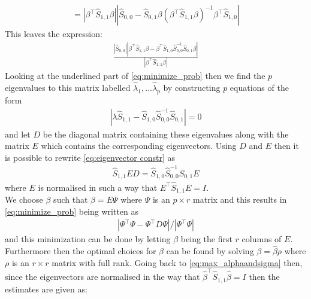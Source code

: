 \begin{bevis}
\begin{align*}
         =|\beta^{\top} \hat{S}_{1,1}\beta||\hat{S}_{0,0}-\hat{S}_{0,1}\beta(\beta^{\top} \hat{S}_{1,1}\beta)^{-1}\beta^{\top}\hat{S}_{1,0}|
 \end{align*}
 This leaves the expression:
 \begin{align}\label{eq:minimize_prob}
     \frac{|\hat{S}_{0,0}||\beta^{\top}\hat{S}_{1,1}\beta-\beta^{\top}\underline{\hat{S}_{1,0}\hat{S}^{-1}_{0,0}\hat{S}_{0,1}}\beta|}
     {|\beta^{\top} \hat{S}_{1,1}\beta|}
 \end{align}
 Looking at the underlined part of \eqref{eq:minimize_prob} then we find the $p$ eigenvalues to this matrix labelled $\hat{\lambda}_1,\ldots\hat{\lambda}_p$ by constructing $p$ equations of the form
 \begin{align}\label{eq:eigenvector constr}
     |\lambda \hat{S}_{1,1}-\hat{S}_{1,0}\hat{S}^{-1}_{0,0}\hat{S}_{0,1}|=0
 \end{align}
and let $D$ be the diagonal matrix containing these eigenvalues along with the matrix $E$ which contains the corresponding eigenvectors. Using $D$ and $E$ then it is possible to rewrite \eqref{eq:eigenvector constr} as
\begin{align*}
    \hat{S}_{1,1}ED=\hat{S}_{1,0}\hat{S}^{-1}_{0,0}\hat{S}_{0,1}E
\end{align*}
where $E$ is normalised in such a way that $E^\top\hat{S}_{1,1}E=I$.\\
We choose $\beta$ such that $\beta=E\Psi$ where $\Psi$ is an $p\times r$ matrix and this results in \eqref{eq:minimize_prob} being written as
\begin{align*}
    |\Psi^\top\Psi-\Psi^\top D\Psi|/|\Psi^\top\Psi|
\end{align*}
and this minimization can be done by letting $\beta$ being the first $r$ columns of $E$. Furthermore then the optimal choices for $\beta$ can be found by solving $\beta=\hat{\beta}\rho$ where $\rho$ is an $r\times r$ matrix with full rank.
Going back to \eqref{eq:max_alphaandsigma} then, since the eigenvectors are normalised in the way that $\hat{\beta}^\top \hat{S}_{1,1}\hat{\beta}=I$ then the estimates are given as:


\end{bevis}
